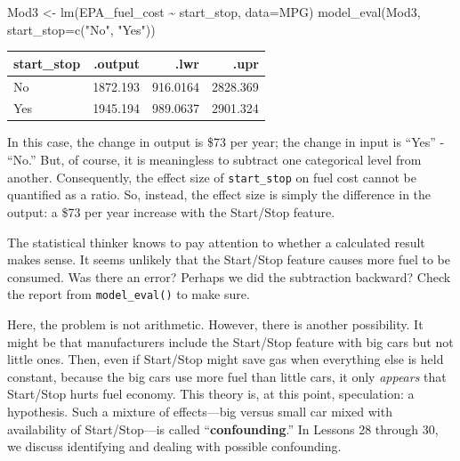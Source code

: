 \documentclass[
  letterpaper,
  DIV=11,
  numbers=noendperiod,
  oneside]{scrreprt}
\newenvironment{Shaded}{\begin{snugshade}}{\end{snugshade}}
\newcommand{\AttributeTok}[1]{\textcolor[rgb]{0.40,0.45,0.13}{#1}}
\newcommand{\FunctionTok}[1]{\textcolor[rgb]{0.28,0.35,0.67}{#1}}
\newcommand{\NormalTok}[1]{\textcolor[rgb]{0.00,0.23,0.31}{#1}}
\newcommand{\OtherTok}[1]{\textcolor[rgb]{0.00,0.23,0.31}{#1}}
\newcommand{\SpecialCharTok}[1]{\textcolor[rgb]{0.37,0.37,0.37}{#1}}
\newcommand{\StringTok}[1]{\textcolor[rgb]{0.13,0.47,0.30}{#1}}
\begin{document}
\begin{Shaded}
\begin{Highlighting}[]
\NormalTok{Mod3 }\OtherTok{\textless{}{-}} \FunctionTok{lm}\NormalTok{(EPA\_fuel\_cost }\SpecialCharTok{\textasciitilde{}}\NormalTok{ start\_stop, }\AttributeTok{data=}\NormalTok{MPG)}
\FunctionTok{model\_eval}\NormalTok{(Mod3, }\AttributeTok{start\_stop=}\FunctionTok{c}\NormalTok{(}\StringTok{"No"}\NormalTok{, }\StringTok{"Yes"}\NormalTok{))}
\end{Highlighting}
\end{Shaded}

\ttfamily 
\begin{tabular}{lrrr}
\toprule
start\_stop & .output & .lwr & .upr\\
\midrule
No & 1872.193 & 916.0164 & 2828.369\\
Yes & 1945.194 & 989.0637 & 2901.324\\
\bottomrule
\end{tabular} \normalfont
\bigskip

In this case, the change in output is \$73 per year; the change in input
is ``Yes'' - ``No.'' But, of course, it is meaningless to subtract one
categorical level from another. Consequently, the effect size of
\texttt{start\_stop} on fuel cost cannot be quantified as a ratio. So,
instead, the effect size is simply the difference in the output: a \$73
per year increase with the Start/Stop feature.

The statistical thinker knows to pay attention to whether a calculated
result makes sense. It seems unlikely that the Start/Stop feature causes
more fuel to be consumed. Was there an error? Perhaps we did the
subtraction backward? Check the report from \texttt{model\_eval()} to
make sure.

Here, the problem is not arithmetic. However, there is another
possibility. It might be that manufacturers include the Start/Stop
feature with big cars but not little ones. Then, even if Start/Stop
might save gas when everything else is held constant, because the big
cars use more fuel than little cars, it only \emph{appears} that
Start/Stop hurts fuel economy. This theory is, at this point,
speculation: a hypothesis. Such a mixture of effects---big versus small
car mixed with availability of Start/Stop---is called
``\textbf{confounding}.'' In Lessons 28 through 30, we discuss
identifying and dealing with possible confounding.
\end{document}
